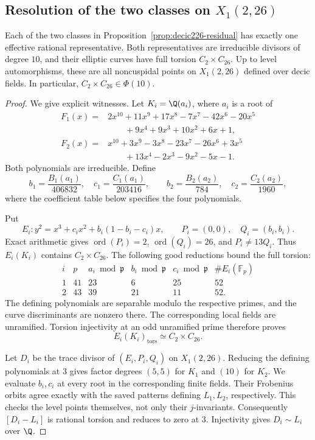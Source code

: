 \subsection{Resolution of the two classes on $X_1(2,26)$}
\begin{proposition}\label{prop:decic226-complete}
Each of the two classes in Proposition~\ref{prop:decic226-residual}
has exactly one effective rational representative. Both representatives
are irreducible divisors of degree $10$, and their elliptic curves have
full torsion $C_2\times C_{26}$. Up to level automorphisms, these are
all noncuspidal points on $X_1(2,26)$ defined over decic fields.
In particular, $C_2\times C_{26}\in\Phi(10)$.
\end{proposition}
\begin{proof}
We give explicit witnesses. Let $K_i=\Q(a_i)$, where $a_i$ is a root of
\[
\begin{aligned}
 F_1(x)={}&2x^{10}+11x^9+17x^8-7x^7-42x^6-20x^5\\
          &\qquad+9x^4+9x^3+10x^2+6x+1,\\
 F_2(x)={}&x^{10}+3x^9-3x^8-23x^7-26x^6+3x^5\\
          &\qquad+13x^4-2x^3-9x^2-5x-1.
\end{aligned}
\]
Both polynomials are irreducible. Define
\[
 b_1=\frac{B_1(a_1)}{406832},\quad
 c_1=\frac{C_1(a_1)}{203416},\qquad
 b_2=\frac{B_2(a_2)}{784},\quad
 c_2=\frac{C_2(a_2)}{1960},
\]
where the coefficient table below specifies the four polynomials.

Put
\[
 E_i:y^2=x^3+c_ix^2+b_i(1-b_i-c_i)x,\qquad
 P_i=(0,0),\quad Q_i=(b_i,b_i).
\]
Exact arithmetic gives $\operatorname{ord}(P_i)=2$,
$\operatorname{ord}(Q_i)=26$, and $P_i\ne13Q_i$.
Thus $E_i(K_i)$ contains $C_2\times C_{26}$.
The following good reductions bound the full torsion:
\[
\begin{array}{c|r|r|r|r|r}
 i&p&a_i\bmod\mathfrak p&b_i\bmod\mathfrak p&c_i\bmod\mathfrak p
       &\#E_i(\mathbb F_p)\\\hline
1&41&23&6&25&52\\
2&43&39&21&11&52.
\end{array}
\]
The defining polynomials are separable modulo the respective primes,
and the curve discriminants are nonzero there. The corresponding
local fields are unramified. Torsion injectivity at an odd unramified
prime therefore proves
\[
 E_i(K_i)_{\mathrm{tors}}\simeq C_2\times C_{26}.
\]

Let $D_i$ be the trace divisor of $(E_i,P_i,Q_i)$ on $X_1(2,26)$.
Reducing the defining polynomials at $3$ gives factor degrees $(5,5)$
for $K_1$ and $(10)$ for $K_2$. We evaluate $b_i,c_i$ at every root
in the corresponding finite fields. Their Frobenius orbits agree
exactly with the saved patterns defining $L_1,L_2$, respectively.
This checks the level points themselves, not only their $j$-invariants.
Consequently $[D_i-L_i]$ is rational torsion and reduces to zero at $3$.
Injectivity gives $D_i\sim L_i$ over $\Q$.


\end{proof}
